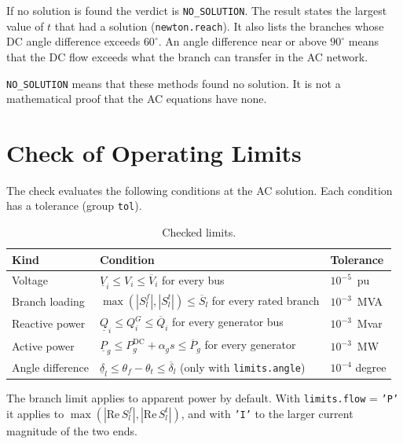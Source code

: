 \documentclass[a4paper,11pt]{article}
\newcommand{\opt}[1]{\texttt{#1}}
\begin{document}
If no solution is found the verdict is \texttt{NO\_SOLUTION}. The result states the largest value of $t$ that had a solution (\texttt{newton.reach}). It also lists the branches whose DC angle difference exceeds $60^\circ$. An angle difference near or above $90^\circ$ means that the DC flow exceeds what the branch can transfer in the AC network.

\begin{warnbox}
\texttt{NO\_SOLUTION} means that these methods found no solution. It is not a mathematical proof that the AC equations have none.
\end{warnbox}

\section{Check of Operating Limits}\label{sec:check}

The check evaluates the following conditions at the AC solution. Each condition has a tolerance (group \opt{tol}).

\begin{table}[H]\centering\small
\begin{tabular}{@{}p{3.2cm}p{7.3cm}p{4.3cm}@{}}
\toprule
\textbf{Kind} & \textbf{Condition} & \textbf{Tolerance} \\
\midrule
Voltage & $\underline{V}_i \le V_i \le \overline{V}_i$ for every bus & $10^{-5}$~pu \\
Branch loading & $\max(|S^f_l|,|S^t_l|) \le \overline{S}_l$ for every rated branch & $10^{-3}$~MVA \\
Reactive power & $\underline{Q}_i \le Q^G_i \le \overline{Q}_i$ for every generator bus & $10^{-3}$~Mvar \\
Active power & $\underline{P}_g \le P^{\mathrm{DC}}_g+\alpha_g s \le \overline{P}_g$ for every generator & $10^{-3}$~MW \\
Angle difference & $\underline{\delta}_l \le \theta_f-\theta_t \le \overline{\delta}_l$ (only with \opt{limits.angle}) & $10^{-4}$ degree \\
\bottomrule
\end{tabular}
\caption{Checked limits.}\label{tab:limits}
\end{table}

The branch limit applies to apparent power by default. With \opt{limits.flow} = \texttt{'P'} it applies to $\max(|\mathrm{Re}\,S^f_l|,|\mathrm{Re}\,S^t_l|)$, and with \texttt{'I'} to the larger current magnitude of the two ends.
\end{document}
